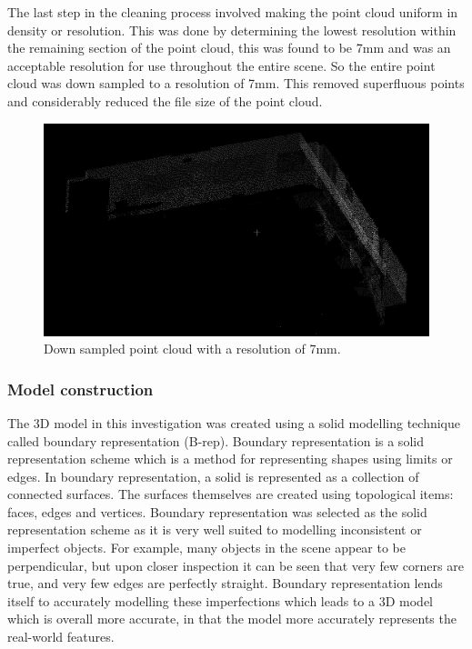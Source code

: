 \documentclass[11pt,a4paper]{report}
\begin{document}
				The last step in the cleaning process involved making the point cloud uniform in density or resolution. This was done by determining the lowest resolution within the remaining section of the point cloud, this was found to be 7mm and was an acceptable resolution for use throughout the entire scene. So the entire point cloud was down sampled to a resolution of 7mm. This removed superfluous points and considerably reduced the file size of the point cloud.
				
				\begin{figure}[H]
					\centering
					\includegraphics[width=1\textwidth]{uniform_point_cloud_1}
					\caption[Down sampled point cloud]{Down sampled point cloud with a resolution of 7mm.}
				\end{figure}
			
			\subsubsection{Model construction}
				The 3D model in this investigation was created using a solid modelling technique called boundary representation (B-rep). Boundary representation is a solid representation scheme which is a method for representing shapes using limits or edges. In boundary representation, a solid is represented as a collection of connected surfaces. The surfaces themselves are created using topological items: faces, edges and vertices.
				\cite{hongxin_zhang_introduction_2007}
				Boundary representation was selected as the solid representation scheme as it is very well suited to modelling inconsistent or imperfect objects. For example, many objects in the scene appear to be perpendicular, but upon closer inspection it can be seen that very few corners are true, and very few edges are perfectly straight. Boundary representation lends itself to accurately modelling these imperfections which leads to a 3D model which is overall more accurate, in that the model more accurately represents the real-world features.
				
\end{document}
